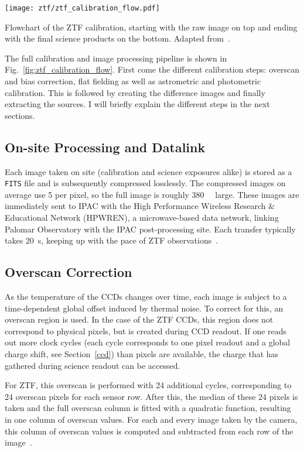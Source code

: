 \begin{marginfigure}
    \texttt{[image: ztf/ztf\_calibration\_flow.pdf]}
    \caption[ZTF realtime flowchart]{Flowchart of the ZTF calibration, starting with the raw image on top and ending with the final science products on the bottom. Adapted from~\cite{Laher2018}.}
\end{marginfigure}

The full calibration and image processing pipeline is shown in Fig.~\ref{fig:ztf_calibration_flow}. First come the different calibration steps: overscan and bias correction, flat fielding as well as astrometric and photometric calibration. This is followed by creating the difference images and finally extracting the sources. I will briefly explain the different steps in the next sections.

\subsection{On-site Processing and Datalink}\label{ztf_data_link}

Each image taken on site (calibration and science exposures alike) is stored as a \texttt{FITS} file and is subsequently compressed losslessly. The compressed images on average use \SI{5}{\bit} per pixel, so the full image is roughly \SI{380}{\mega\byte} large. These images are immediately sent to IPAC with the High Performance Wireless Research \& Educational Network (HPWREN), a microwave-based data network, linking Palomar Observatory with the IPAC post-processing site. Each transfer typically takes \SI{20}{\second}, keeping up with the pace of ZTF observations~\cite{Dekany2020}.

\subsection{Overscan Correction}
As the temperature of the CCDs changes over time, each image is subject to a time-dependent global offset induced by thermal noise. To correct for this, an overscan region is used. In the case of the ZTF CCDs, this region does not correspond to physical pixels, but is created during CCD readout. If one reads out more clock cycles (each cycle corresponds to one pixel readout and a global charge shift, see Section~\ref{ccd}) than pixels are available, the charge that has gathered during science readout can be accessed.

For ZTF, this overscan is performed with 24 additional cycles, corresponding to 24 overscan pixels for each sensor row. After this, the median of these 24 pixels is taken and the full overscan column is fitted with a quadratic function, resulting in one column of overscan values. For each and every image taken by the camera, this column of overscan values is computed and subtracted from each row of the image~\cite{Masci2019a}.

